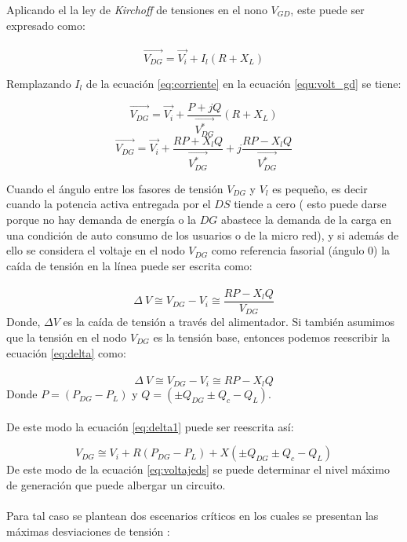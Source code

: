 \documentclass[12pt, letterpaper]{report}
\begin{document}
Aplicando el la ley de \textit{ Kirchoff } de tensiones en el nono  $V_{GD}$, este  puede ser expresado como:\\\\
\begin{equation}
\label{equ:volt_gd}
\overrightarrow{V_{DG}}= \overrightarrow{V_{i}} + I_{l}(R + X_{L})
\end{equation}

Remplazando $ I_{l} $ de  la ecuación \ref{eq:corriente} en la ecuación  \ref{equ:volt_gd} se tiene:

\[\overrightarrow{V_{DG}}= \overrightarrow{V_{i}} + \dfrac{P + jQ}{\overrightarrow{V_{DG}^{*}}}(R + X_{L})\]
\begin{equation}
\overrightarrow{V_{DG}}= \overrightarrow{V_{i}} + \dfrac{RP + X_{l}Q}{\overrightarrow{V_{DG}^{*}}} + j\dfrac{RP - X_{l}Q }{\overrightarrow{V_{DG}^{*}}}
\end{equation}

Cuando el ángulo entre los fasores de tensión  $V_{DG}$  y $V_{l}$ es pequeño, es decir cuando la potencia activa entregada por el $DS$ tiende a cero \cite{Akagi2017} (  esto puede darse porque no hay demanda de energía o la $DG$ abastece la demanda de la carga en una condición de auto consumo de los usuarios o de la micro red), y si además de ello se considera el voltaje en el nodo $V_{DG}$ como referencia fasorial (ángulo 0) la caída de tensión en la línea puede ser escrita como:\\\\
\begin{equation}
\Delta\ V \cong V_{DG} - V_{i}\cong \dfrac{RP - X_{l}Q }{V_{DG}}
\label{eq:delta} 
\end{equation}
Donde, $\Delta V$ es la caída de tensión a través del alimentador. Si también asumimos que la tensión en el nodo  $V_{DG}$  es la tensión base, entonces podemos reescribir la ecuación \ref{eq:delta} como:\\\\
\begin{equation}
\Delta\ V \cong V_{DG} - V_{i}\cong RP - X_{l}Q 
\label{eq:delta1} 
\end{equation}
Donde $P=(P_{DG}-P_{L})$  y  $ Q = (\pm Q_{DG} \pm Q_{c} - Q_{L})$.\\\\
De este modo la ecuación \ref{eq:delta1} puede ser reescrita así:

\begin{equation}
V_{DG} \cong V_{i} + R (P_{DG} - P_{L}) + X(\pm Q_{DG} \pm Q_{c} - Q_{L})
\label{eq:voltajeds}
\end{equation}
De este modo  de la ecuación \ref{eq:voltajeds} se puede determinar  el nivel máximo de generación que puede  albergar un circuito.\\\\
Para tal caso se plantean dos escenarios críticos en los cuales se presentan las máximas desviaciones de tensión \cite{Elkhatib2011a}:\\\\
\end{document}
